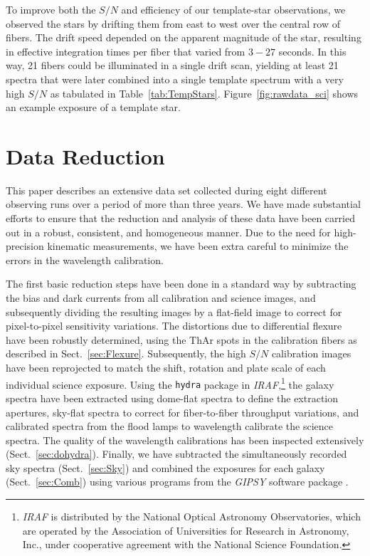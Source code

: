 \documentclass[traditabstract]{aa} %
\begin{document}
To improve both the $S/N$ and efficiency of our template-star observations, we
observed the stars by drifting them from east to west over the central row of
fibers.  The drift speed depended on the apparent magnitude of the star,
resulting in effective integration times per fiber that varied from $3-27$
seconds.  In this way, 21 fibers could be illuminated in a single drift scan,
yielding at least 21 spectra that were later combined into a single template
spectrum with a very high $S/N$ as tabulated in Table~\ref{tab:TempStars}.
Figure~\ref{fig:rawdata_sci} shows an example exposure of a template star.


\section{Data Reduction}
\label{sec:Reduction}

This paper describes an extensive data set collected during eight different
observing runs over a period of more than three years.  We have made
substantial efforts to ensure that the reduction and analysis of these data have
been carried out in a robust, consistent, and homogeneous manner.  Due to the
need for high-precision kinematic measurements, we have been extra careful to
minimize the errors in the wavelength calibration.

The first basic reduction steps have been done in a standard way by subtracting
the bias and dark currents from all calibration and science images, and
subsequently dividing the resulting images by a flat-field image to correct for
pixel-to-pixel sensitivity variations. The distortions due to differential
flexure have been robustly determined, using the ThAr spots in the calibration
fibers as described in Sect.~\ref{sec:Flexure}.  Subsequently, the high $S/N$
calibration images have been reprojected to match the shift, rotation and plate
scale of each individual science exposure.  Using the {\tt hydra} package in
{\it IRAF},\footnote{
%
{\it IRAF} is distributed by the National Optical Astronomy Observatories, which
are operated by the Association of Universities for Research in Astronomy, Inc.,
under cooperative agreement with the National Science Foundation.
%
} the galaxy spectra have been extracted using dome-flat spectra to define the
extraction apertures, sky-flat spectra to correct for fiber-to-fiber throughput
variations, and calibrated spectra from the flood lamps to wavelength calibrate
the science spectra.  The quality of the wavelength calibrations has been
inspected extensively (Sect.~\ref{sec:dohydra}). Finally, we have subtracted
the simultaneously recorded sky spectra (Sect.~\ref{sec:Sky}) and combined the
exposures for each galaxy (Sect.~\ref{sec:Comb}) using various programs from
the {\it GIPSY} software package \citep{hulst1992, vogelaar2001}.
\end{document}
